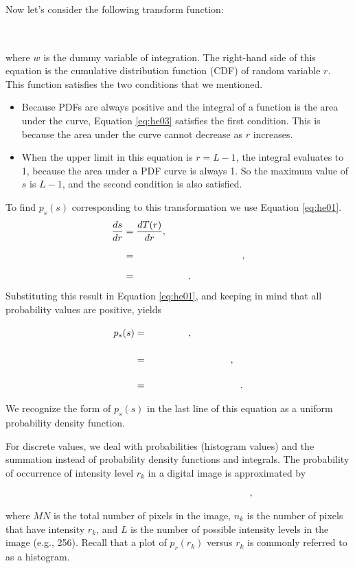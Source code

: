 \begin{frame}[allowframebreaks]
Now let's consider the following transform function:
	\begin{equation}\label{eq:he03}
		\fillblank{s = T(r) =(L -1)\int_0^r p_r(w)dw,}
	\end{equation}
where $w$ is the dummy variable of integration. The right-hand side of this equation is the cumulative distribution function (CDF) of random variable $r$. This function satisfies the two conditions that we mentioned.
\begin{itemize}
	\item Because PDFs are always positive and the integral of a function is the area under the curve, Equation \ref{eq:he03} satisfies the first condition. This is because the area under the curve cannot decrease as $r$ increases.
	\item When the upper limit in this equation is $r= L-1$, the integral evaluates to 1, because the area under a PDF curve is always 1. So the maximum value of $s$ is $L-1$, and the second condition is also satisfied.
\end{itemize}
To find $p_s(s)$ corresponding to this transformation we use Equation \ref{eq:he01}.
	\begin{equation}\label{eq:he04}
		\begin{split}
		\frac{ds}{dr} &= \frac{dT(r)}{dr},\\
									&= \fillblank{(L-1) \frac{d}{dr}\left[\int_0^r p_r(w)dw\right]},\\
									&= \fillblank{(L-1) p_r(r)}.\\
		\end{split}
	\end{equation}
Substituting this result in Equation \ref{eq:he01}, and keeping in mind that all probability values are positive, yields
	\begin{equation}\label{eq:he04}
		\begin{split}
		p_s(s) &=  \fillblank{p_r(r) \left|\frac{dr}{ds}\right|},\\
									&= \fillblank{p_r(r) \left|\frac{1}{(L-1)p_r(r)}\right|},\\
									&= \fillblank{\frac{1}{L-1}\quad 0 \leq s \leq L -1}.\\
		\end{split}
	\end{equation}
	We recognize the form of $p_s(s)$ in the last line of this equation as a uniform probability density function.
	
	For discrete values, we deal with probabilities (histogram values) and the summation instead of probability density functions and integrals. The probability of occurrence of intensity level $r_k$ in a digital image is approximated by
	\begin{equation}\label{eq:he05}
		\fillblank{p_r(r_k) = \frac{n_k}{MN}\quad k = 0,1, \dots, L -1},
	\end{equation}
	where $MN$ is the total number of pixels in the image, $n_k$ is the number of pixels that have intensity $r_k$, and $L$ is the number of possible intensity levels in the image (e.g., 256). Recall that a plot of $p_r(r_k)$ versus $r_k$ is commonly referred to as a histogram.


\end{frame}
